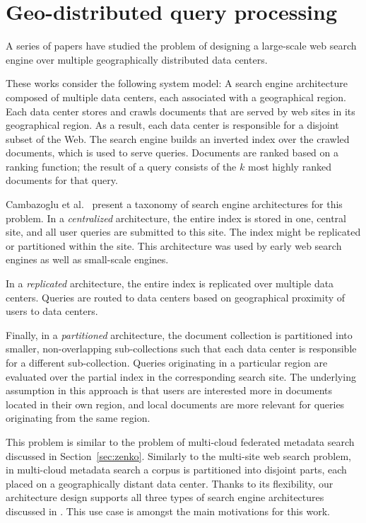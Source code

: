 \section{Geo-distributed query processing}
\label{sec:federation}

A series of papers \cite{cambazoglu:multisitequantifying, yates:multisitefeasibility, cambazoglu:multisiteforwarding, frances:multisiteefficiency, kayaaslan:multisitereplication}
have studied the problem of designing a large-scale web search engine over multiple geographically distributed data centers.

These works consider the following system model:
A search engine architecture composed of multiple data centers, each associated with a geographical region.
Each data center stores and crawls documents that are served by web sites in its geographical region.
As a result, each data center is responsible for a disjoint subset of the Web.
The search engine builds an inverted index over the crawled documents, which is used to serve queries.
Documents are ranked based on a ranking function; the result of a query consists of the $k$ most highly ranked documents
for that query.

Cambazoglu et al.\ \cite{cambazoglu:multisitequantifying} present a taxonomy of search engine architectures for this problem.
In a \textit{centralized} architecture, the entire index is stored in one, central site, and all user queries are submitted to this site.
The index might be replicated or partitioned within the site.
This architecture was used by early web search engines as well as small-scale engines.

In a \textit{replicated} architecture, the entire index is replicated over multiple data centers.
Queries are routed to data centers based on geographical proximity of users to data centers.

Finally, in a \textit{partitioned} architecture, the document collection is partitioned into smaller, non-overlapping
sub-collections such that each data center is responsible for a different sub-collection.
Queries originating in a particular region are evaluated over the partial index in the corresponding search site.
The underlying assumption in this approach is that users are interested more in documents located in their own region,
and local documents are more relevant for queries originating from the same region.

This problem is similar to the problem of multi-cloud federated metadata search discussed in Section~\ref{sec:zenko}.
Similarly to the multi-site web search problem,
in multi-cloud metadata search a corpus is partitioned into disjoint parts, each placed on a geographically distant
data center.
Thanks to its flexibility, our architecture design supports all three types of search engine architectures discussed in
\cite{cambazoglu:multisitequantifying}.
This use case is amongst the main motivations for this work.

